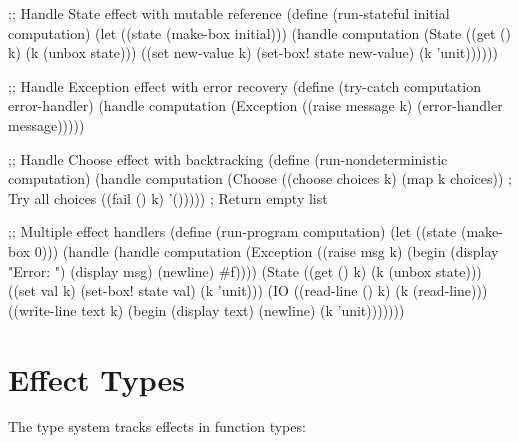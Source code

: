 \begin{example}
\begin{lambdustcode}
;; Handle State effect with mutable reference
(define (run-stateful initial computation)
  (let ((state (make-box initial)))
    (handle computation
      (State 
        ((get () k) 
         (k (unbox state)))
        ((set new-value k)
         (set-box! state new-value)
         (k 'unit))))))

;; Handle Exception effect with error recovery
(define (try-catch computation error-handler) 
  (handle computation
    (Exception
      ((raise message k)
       (error-handler message)))))

;; Handle Choose effect with backtracking
(define (run-nondeterministic computation)
  (handle computation
    (Choose
      ((choose choices k)
       (map k choices))           ; Try all choices
      ((fail () k)
       '()))))                    ; Return empty list

;; Multiple effect handlers
(define (run-program computation)
  (let ((state (make-box 0)))
    (handle 
      (handle computation
        (Exception
          ((raise msg k) 
           (begin (display "Error: ") (display msg) (newline)
                  #f))))
      (State
        ((get () k) (k (unbox state)))
        ((set val k) (set-box! state val) (k 'unit)))
      (IO  
        ((read-line () k) (k (read-line)))
        ((write-line text k) (begin (display text) (newline) (k 'unit)))))))
\end{lambdustcode}
\end{example}

\section{Effect Types}
\label{sec:effect-types}


The type system tracks effects in function types:

\begin{grammar}
\\
\end{grammar}

